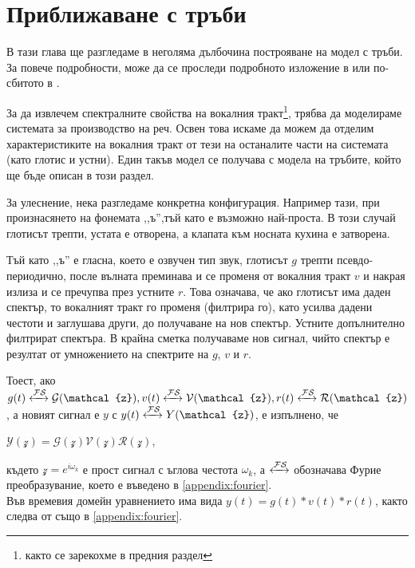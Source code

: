 \documentclass[main.tex]{subfiles}
\begin{document}
\section{Приближаване с тръби}
\label{tubes}
В тази глава ще разгледаме в неголяма дълбочина построяване на модел с тръби. За повече подробности, може да се проследи подробното изложение в \cite{rabiner_schafer78} или по-сбитото в \cite{taylor:2009}.

За да извлечем спектралните свойства на вокалния тракт\footnote{както се зарекохме в предния раздел}, трябва да моделираме системата за производство на реч. Освен това искаме да можем да отделим характеристиките на вокалния тракт от тези на останалите части на системата (като глотис и устни). Един такъв модел се получава с модела на тръбите, който ще бъде описан в този раздел.

За улеснение, нека разгледаме конкретна конфигурация. Например тази, при произнасянето на фонемата ,,ъ'',тъй като е възможно най-проста. В този случай глотисът трепти, устата е отворена, а клапата към носната кухина е затворена.

Тъй като ,,ъ'' е гласна, което е озвучен тип звук, глотисът $g$ трепти псевдо-периодично, после вълната преминава и се променя от вокалния тракт $v$ и накрая излиза и се пречупва през устните $r$. Това означава, че ако глотисът има даден спектър, то вокалният тракт го променя (филтрира го), като усилва дадени честоти и заглушава други, до получаване на нов спектър. Устните допълнително филтрират спектъра. В крайна сметка получаваме нов сигнал, чийто спектър е резултат от умножението на спектрите на $g$, $v$ и $r$.

Тоест, ако $g(t) \xleftrightarrow{\mathcal{F}\mathcal{S}} \mathcal{G}(\mathcal{z}), v(t) \xleftrightarrow{\mathcal{F}\mathcal{S}} \mathcal{V}(\mathcal{z}), r(t) \xleftrightarrow{\mathcal{F}\mathcal{S}} \mathcal{R}(\mathcal{z})$, а новият сигнал е $y$ с $y(t) \xleftrightarrow{\mathcal{F}\mathcal{S}} Y(\mathcal{z})$, е изпълнено, че

$\mathcal{Y}(\mathcal{z}) = \mathcal{G}(\mathcal{z}) \mathcal{V}(\mathcal{z}) \mathcal{R}(\mathcal{z})$,

където $\mathcal{z} = e^{i\omega_k}$ е прост сигнал с ъглова честота $\omega_k$, а $\xleftrightarrow{\mathcal{F}\mathcal{S}}$ обозначава Фурие преобразувание, което е въведено в \autoref{appendix:fourier}.\\

Във времевия домейн уравнението има вида $y(t) = g(t)\ast v(t)\ast r(t)$, както следва от  също в \autoref{appendix:fourier}.
\end{document}
